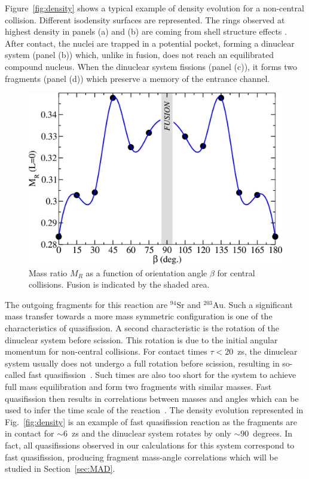 Figure~\ref{fig:density} shows a typical example of density evolution for a non-central collision.
Different isodensity surfaces are represented.
The rings observed at highest density in panels (a) and (b) are coming from shell structure effects \citep{simenel2012}.
After contact, the nuclei are trapped in a potential pocket, forming a dinuclear system (panel (b)) which, unlike in fusion, does not reach an equilibrated compound nucleus.
When the dinuclear system fissions (panel (c)), it forms two fragments (panel (d)) which preserve a memory of the entrance channel.
\begin{figure}
	\includegraphics*[width=\textwidth]{../Figures/CaBk/central_beta.pdf}
	\caption{Mass ratio $M_R$ as a function of orientation angle $\beta$ for central collisions. Fusion is indicated by the shaded area. }
	\label{fig:central_beta}
\end{figure}

The outgoing fragments for this reaction are $^{94}$Sr and $^{203}$Au.
Such a significant mass transfer towards a more mass symmetric configuration is one of the characteristics of quasifission.
A second characteristic is the rotation of the dinuclear system before scission.
This rotation is due to the initial angular momentum for non-central collisions.
For contact times $\tau<20$~zs, the dinuclear system usually does not undergo a full rotation before scission, resulting in so-called fast quasifission~\citep{durietz2013,hinde2018}.
Such times are also too short for the system to achieve full mass equilibration and form two fragments with similar masses.
Fast quasifission then results in correlations between masses and angles which can be used to infer the time scale of the reaction~\citep{toke1985,durietz2011}.
The density evolution represented in Fig.~\ref{fig:density} is an example of fast quasifission reaction as the fragments are
in contact for $\sim6$~zs and the dinuclear system rotates by only $\sim90$~degrees.
In fact, all quasifissions observed in our calculations for this system correspond to fast quasifission, producing fragment mass-angle correlations which will be studied in Section~\ref{sec:MAD}.

